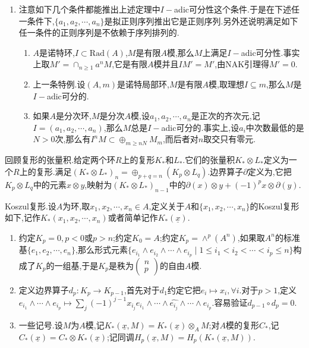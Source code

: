 \begin{enumerate}
\begin{proof}
		最后我们证明上一段中断言的$\omega\in I^{w-1}M$.我们设$\omega\in I^mM,m<w-1$,现在证明$\omega\in I^{m+1}M$,于是从$\omega\in I^0M=M$,反复运用这个结论就得到$\omega\in I^{w-1}M$.现在记$\omega=G(a_1,a_2,\cdots,a_n)$,其中$G$是一个$M[X_1,X_2,\cdots,X_n]$中的$m$次齐次多项式.记$G_0=X_1G$,那么$G_0(a_1,a_2,\cdots,a_n)=a_1\omega=F(a_2,a_3,\cdots,a_n)\in I^wM$,于是从$\{a_1,a_2,\cdots,a_n\}$的拟正则性得到$G_0\in IM[X_1,X_2,\cdots,X_n]$,于是$G\in IM[X_1,X_2,\cdots,X_n]$.换句话讲$G$的系数仍然可以提出$I$中的元,于是得到$\omega\in I^{m+1}M$.注意这件事至多可以做到$m=w-1$.
	\end{proof}
	\item 注意如下几个条件都能推出上述定理中$I-$adic可分性这个条件.于是在下述任一条件下,$\{a_1,a_2,\cdots,a_n\}$是拟正则序列推出它是正则序列.另外还说明满足如下任一条件的正则序列是不依赖于序列排列的.
	\begin{enumerate}
		\item $A$是诺特环,$I\subset\mathrm{Rad}(A)$,$M$是有限$A$模,那么$M$上满足$I-$adic可分性.事实上取$M'=\cap_{n\ge1}a^nM$,它是有限$A$模并且$IM'=M'$,由NAK引理得$M'=0$.
		\item 上一条特例.设$(A,m)$是诺特局部环,$M$是有限$A$模,取理想$I\subseteq m$,那么$M$是$I-$adic可分的.
		\item 如果$A$是分次环,$M$是分次$A$模,设$a_1,a_2,\cdots,a_n$是正次的齐次元,记$I=(a_1,a_2,\cdots,a_n)$,那么$M$总是$I-$adic可分的.事实上,设$a_i$中次数最低的是$N>0$次,那么有$I^nM\subset\oplus_{m\ge nN}M_m$,而后者对$n$取交只有零元.
	\end{enumerate} 
\end{enumerate}

回顾复形的张量积.给定两个环$R$上的复形$K_*$和$L_*$.它们的张量积$K_*\otimes L_*$定义为一个$R$上的复形.满足$(K_*\otimes L_*)_n=\oplus_{p+q=n}(K_p\otimes L_q)$.边界算子$\partial$定义为,它把$K_p\otimes L_q$中的元素$x\otimes y$,映射为$(K_*\otimes L_*)_{n-1}$中的$\partial(x)\otimes y+(-1)^px\otimes\partial(y)$.

Koszul复形.设$A$为环,取$x_1,x_2,\cdots,x_n\in A$,定义关于$A$和$\{x_1,x_2,\cdots,x_n\}$的Koszul复形如下,记作$K_*(x_1,x_2,\cdots,x_n)$或者简单记作$K_*(\underline{x})$.
\begin{enumerate}
	\item 约定$K_p=0,p<0$或$p>n$;约定$K_0=A$;约定$K_p=\wedge^p(A^n)$,如果取$A^n$的标准基$\{e_1,e_2,\cdots,e_n\}$,那么形式元素$\{e_{i_1}\wedge e_{i_2}\wedge\cdots\wedge e_{i_p}\mid 1\le i_1<i_2<\cdots<i_p\le n\}$构成了$K_p$的一组基,于是$K_p$是秩为$\left(\begin{array}{c} n\\p\end{array}\right)$的自由$A$模.
	\item 定义边界算子$d_p:K_p\to K_{p-1}$,首先对于$d_1$约定它把$e_i\mapsto x_i,\forall i$.对于$p>1$,定义$e_{i_1}\wedge\cdots\wedge e_{i_p}\mapsto\sum_j(-1)^{j-1}x_{i_j}e_{i_1}\wedge\cdots\wedge\widehat{e_{i_j}}\wedge\cdots\wedge e_{i_p}$.容易验证$d_{p-1}\circ d_p=0$.
	\item 一些记号.设$M$为$A$模,记$K_*(\underline{x},M)=K_*(\underline{x})\otimes_AM$;对$A$模的复形$C_*$,记$C_*(\underline{x})=C_*\otimes K_*(\underline{x})$;记同调$H_p(\underline{x},M)=H_p(K_*(\underline{x},M))$.
\end{enumerate}

